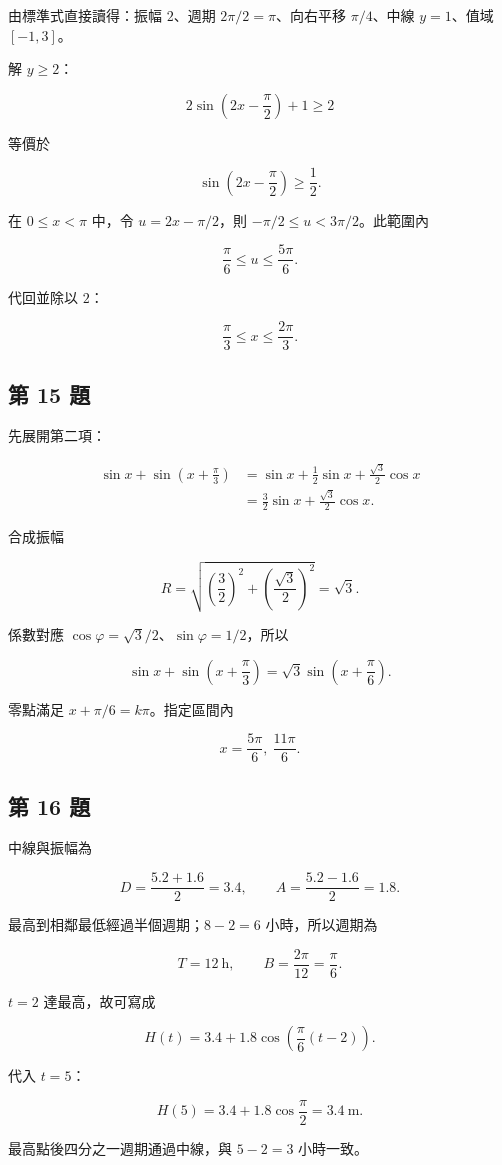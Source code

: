 \documentclass[11pt,a4paper]{article}
\begin{document}
由標準式直接讀得：振幅 \(2\)、週期 \(2\pi/2=\pi\)、向右平移 \(\pi/4\)、中線 \(y=1\)、值域 \([-1,3]\)。

解 \(y\ge2\)：

\[
2\sin\left(2x-\frac\pi2\right)+1\ge2
\]

等價於

\[
\sin\left(2x-\frac\pi2\right)\ge\frac12.
\]

在 \(0\le x<\pi\) 中，令 \(u=2x-\pi/2\)，則 \(-\pi/2\le u<3\pi/2\)。此範圍內

\[
\frac\pi6\le u\le\frac{5\pi}{6}.
\]

代回並除以 \(2\)：

\[
\boxed{\frac\pi3\le x\le\frac{2\pi}{3}}.
\]

\subsection{第 15 題}\label{ux7b2c-15-ux984c}

先展開第二項：

\[
\begin{aligned}
\sin x+\sin\left(x+\frac\pi3\right)
&=\sin x+\frac12\sin x+\frac{\sqrt3}{2}\cos x\\
&=\frac32\sin x+\frac{\sqrt3}{2}\cos x.
\end{aligned}
\]

合成振幅

\[
R=\sqrt{\left(\frac32\right)^2+
\left(\frac{\sqrt3}{2}\right)^2}=\sqrt3.
\]

係數對應 \(\cos\varphi=\sqrt3/2\)、\(\sin\varphi=1/2\)，所以

\[
\boxed{\sin x+\sin\left(x+\frac\pi3\right)
=\sqrt3\sin\left(x+\frac\pi6\right)}.
\]

零點滿足 \(x+\pi/6=k\pi\)。指定區間內

\[
\boxed{x=\frac{5\pi}{6},\ \frac{11\pi}{6}}.
\]

\subsection{第 16 題}\label{ux7b2c-16-ux984c}

中線與振幅為

\[
D=\frac{5.2+1.6}{2}=3.4,
\qquad
A=\frac{5.2-1.6}{2}=1.8.
\]

最高到相鄰最低經過半個週期；\(8-2=6\) 小時，所以週期為

\[
T=12\ \mathrm h,
\qquad
B=\frac{2\pi}{12}=\frac\pi6.
\]

\(t=2\) 達最高，故可寫成

\[
\boxed{H(t)=3.4+1.8\cos\left(\frac\pi6(t-2)\right)}.
\]

代入 \(t=5\)：

\[
H(5)=3.4+1.8\cos\frac\pi2
=\boxed{3.4\ \mathrm m}.
\]

最高點後四分之一週期通過中線，與 \(5-2=3\) 小時一致。
\end{document}
